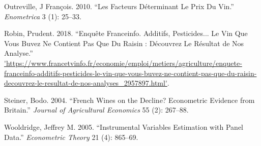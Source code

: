 \documentclass[11pt,]{article}
\begin{document}
\leavevmode\hypertarget{ref-outreville2010}{}%
Outreville, J François. 2010. ``Les Facteurs Déterminant Le Prix Du
Vin.'' \emph{Enometrica} 3 (1): 25--33.

\leavevmode\hypertarget{ref-Prudent2018}{}%
Robin, Prudent. 2018. ``Enquête Franceinfo. Additifs, Pesticides... Le
Vin Que Vous Buvez Ne Contient Pas Que Du Raisin : Découvrez Le Résultat
de Nos Analyse.''
\url{'https://www.francetvinfo.fr/economie/emploi/metiers/agriculture/enquete-franceinfo-additifs-pesticides-le-vin-que-vous-buvez-ne-contient-pas-que-du-raisin-decouvrez-le-resultat-de-nos-analyses_2957897.html'}.

\leavevmode\hypertarget{ref-steiner2004}{}%
Steiner, Bodo. 2004. ``French Wines on the Decline? Econometric Evidence
from Britain.'' \emph{Journal of Agricultural Economics} 55 (2):
267--88.

\leavevmode\hypertarget{ref-wooldridge2005instrumental}{}%
Wooldridge, Jeffrey M. 2005. ``Instrumental Variables Estimation with
Panel Data.'' \emph{Econometric Theory} 21 (4): 865--69.
\end{document}
